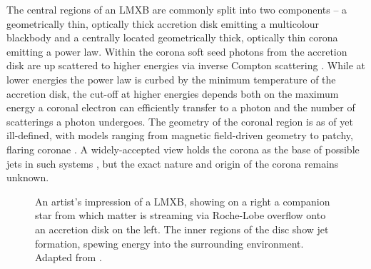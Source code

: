 The central regions of an \ac{LMXB} are commonly split into two components -- a geometrically thin, optically thick accretion disk emitting a multicolour blackbody and a centrally located geometrically thick, optically thin corona emitting a power law. Within the corona soft seed photons from the accretion disk are up scattered to higher energies via inverse Compton scattering \citep[e.g.][]{done2007modelling}. While at lower energies the power law is curbed by the minimum temperature of the accretion disk, the cut-off at higher energies depends both on the maximum energy a coronal electron can efficiently transfer to a photon and the number of scatterings a photon undergoes. The geometry of the coronal region is as of yet ill-defined, with models ranging from magnetic field-driven geometry \citep{galeev1979structured} to patchy, flaring coronae \citep{gilfanov2010x}. A widely-accepted view holds the corona as the base of possible jets in such systems \citep[e.g.][]{markoff2005going}, but the exact nature and origin of the corona remains unknown.\\

\begin{figure}%
\myfloatalign%
\caption[Artist's impression of a \acs{LMXB}]{An artist's impression of a \ac{LMXB}, showing on a right a companion star from which matter is streaming via Roche-Lobe overflow onto an accretion disk on the left. The inner regions of the disc show jet formation, spewing energy into the surrounding environment. Adapted from \citet{cygnusx1}.}\label{fig:lmxb}
\end{figure}


